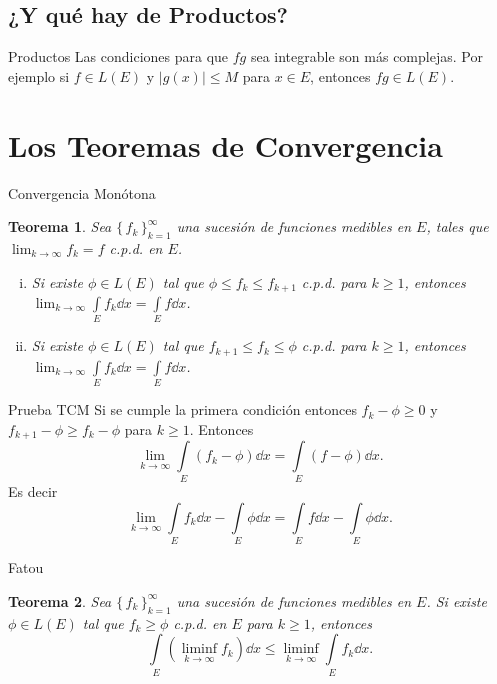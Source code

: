 \documentclass[utf8]{beamer}
\theoremstyle{plain}
\newtheorem{Th}{Teorema}               %
\theoremstyle{definition}
\theoremstyle{remark}
\numberwithin{equation}{section}
\newcommand{\set}[1]{\{\,#1\,\}}    %
\renewcommand{\geq}{\geqslant}          %
\renewcommand{\leq}{\leqslant}          %
\newcommand{\suck}{_{k=1}^\infty} %
\renewcommand{\.}{\Cdot}                %
\begin{document}
\subsection{¿Y qué hay de Productos?}

\begin{frame}{Productos}
  Las condiciones para que $fg$ sea integrable son más complejas. Por ejemplo si $f\in L(E)$ y $|g(x)|\leq M$ para $x\in E$, entonces $fg\in L(E)$.
\end{frame}

\section{Los Teoremas de Convergencia}

\begin{frame}{Convergencia Monótona}
  \begin{Th}\label{th:TCM}
    Sea $\set{f_k}\suck$ una sucesión de funciones medibles en $E$, tales que $\lim_{k\to\infty}f_k=f$ c.p.d. en $E$.
    \begin{enumerate}[(i)]
      \item Si existe $\phi\in L(E)$ tal que $\phi\leq f_k\leq f_{k+1}$ c.p.d. para $k\geq 1$, entonces $\lim_{k\to\infty}\int\limits_Ef_k\dd x=\int\limits_Ef\dd x$.
      \item Si existe $\phi\in L(E)$ tal que $f_{k+1}\leq f_k\leq \phi$ c.p.d. para $k\geq 1$, entonces $\lim_{k\to\infty}\int\limits_Ef_k\dd x=\int\limits_Ef\dd x$.
    \end{enumerate}
  \end{Th}
\end{frame}

\begin{frame}{Prueba TCM}
  Si se cumple la primera condición entonces $f_k-\phi\geq 0$ y $f_{k+1}-\phi\geq f_{k}-\phi$ para $k\geq 1$. Entonces 
  $$\lim_{k\to\infty}\int\limits_E(f_k-\phi)\dd x=\int\limits_E(f-\phi)\dd x.$$
  Es decir 
  $$\lim_{k\to\infty}\int\limits_Ef_k\dd x-\int\limits_E\phi\dd x=\int\limits_Ef\dd x-\int\limits_E\phi\dd x.$$
\end{frame}

\begin{frame}{Fatou}
  \begin{Th}\label{th:fatou}
    Sea $\set{f_k}\suck$ una sucesión de funciones medibles en $E$. Si existe $\phi\in L(E)$ tal que $f_k\geq\phi$ c.p.d. en $E$ para $k\geq 1$, entonces 
    $$\int\limits_E\left(\liminf_{k\to\infty}f_k\right)\dd x\leq \liminf_{k\to\infty}\int\limits_Ef_k\dd x.$$
  \end{Th}
\end{frame}
\end{document}
